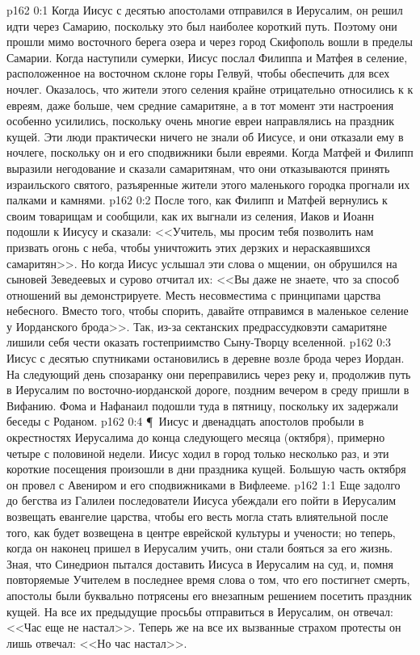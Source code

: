 \vs p162 0:1 Когда Иисус с десятью апостолами отправился в Иерусалим, он решил идти через Самарию, поскольку это был наиболее короткий путь. Поэтому они прошли мимо восточного берега озера и через город Скифополь вошли в пределы Самарии. Когда наступили сумерки, Иисус послал Филиппа и Матфея в селение, расположенное на восточном склоне горы Гелвуй, чтобы обеспечить для всех ночлег. Оказалось, что жители этого селения крайне отрицательно относились к к евреям, даже больше, чем средние самаритяне, а в тот момент эти настроения особенно усилились, поскольку очень многие евреи направлялись на праздник кущей. Эти люди практически ничего не знали об Иисусе, и они отказали ему в ночлеге, поскольку он и его сподвижники были евреями. Когда Матфей и Филипп выразили негодование и сказали самаритянам, что они отказываются принять израильского святого, разъяренные жители этого маленького городка прогнали их палками и камнями.
\vs p162 0:2 После того, как Филипп и Матфей вернулись к своим товарищам и сообщили, как их выгнали из селения, Иаков и Иоанн подошли к Иисусу и сказали: <<Учитель, мы просим тебя позволить нам призвать огонь с неба, чтобы уничтожить этих дерзких и нераскаявшихся самаритян>>. Но когда Иисус услышал эти слова о мщении, он обрушился на сыновей Зеведеевых и сурово отчитал их: <<Вы даже не знаете, что за способ отношений вы демонстрируете. Месть несовместима с принципами царства небесного. Вместо того, чтобы спорить, давайте отправимся в маленькое селение у Иорданского брода>>. Так, из\hyp{}за сектанских предрассудковэти самаритяне лишили себя чести оказать гостеприимство Сыну\hyp{}Творцу вселенной.
\vs p162 0:3 Иисус с десятью спутниками остановились в деревне возле брода через Иордан. На следующий день спозаранку они переправились через реку и, продолжив путь в Иерусалим по восточно\hyp{}иорданской дороге, поздним вечером в среду пришли в Вифанию. Фома и Нафанаил подошли туда в пятницу, поскольку их задержали беседы с Роданом.
\vs p162 0:4 \P\ Иисус и двенадцать апостолов пробыли в окрестностях Иерусалима до конца следующего месяца (октября), примерно четыре с половиной недели. Иисус ходил в город только несколько раз, и эти короткие посещения произошли в дни праздника кущей. Большую часть октября он провел с Авениром и его сподвижниками в Вифлееме.
\vs p162 1:1 Еще задолго до бегства из Галилеи последователи Иисуса убеждали его пойти в Иерусалим возвещать евангелие царства, чтобы его весть могла стать влиятельной после того, как будет возвещена в центре еврейской культуры и учености; но теперь, когда он наконец пришел в Иерусалим учить, они стали бояться за его жизнь. Зная, что Синедрион пытался доставить Иисуса в Иерусалим на суд, и, помня повторяемые Учителем в последнее время слова о том, что его постигнет смерть, апостолы были буквально потрясены его внезапным решением посетить праздник кущей. На все их предыдущие просьбы отправиться в Иерусалим, он отвечал: <<Час еще не настал>>. Теперь же на все их вызванные страхом протесты он лишь отвечал: <<Но час настал>>.
